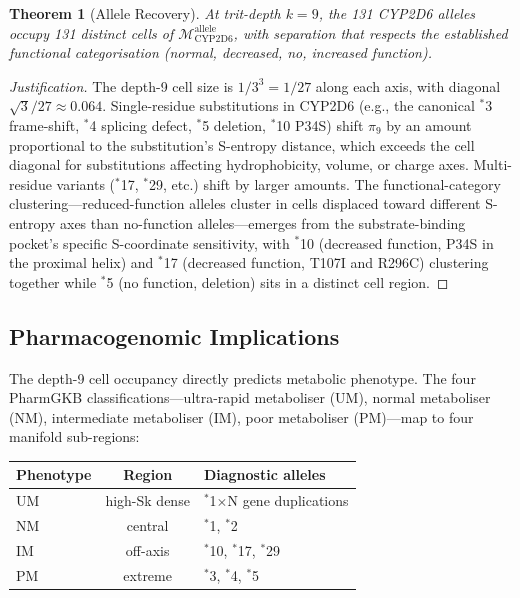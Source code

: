 \documentclass[11pt,twocolumn,a4paper]{article}
\newtheorem{theorem}{Theorem}[section]
\theoremstyle{definition}
\theoremstyle{remark}
\begin{document}
\begin{theorem}[Allele Recovery]
\label{thm:allele_recovery}
At trit-depth $k = 9$, the 131 CYP2D6 alleles occupy 131 distinct cells of $\mathcal{M}_{\mathrm{CYP2D6}}^{\mathrm{allele}}$, with separation that respects the established functional categorisation (normal, decreased, no, increased function).
\end{theorem}

\begin{proof}[Justification]
The depth-9 cell size is $1/3^3 = 1/27$ along each axis, with diagonal $\sqrt{3}/27 \approx 0.064$. Single-residue substitutions in CYP2D6 (e.g., the canonical $^*$3 frame-shift, $^*$4 splicing defect, $^*$5 deletion, $^*$10 P34S) shift $\pi_9$ by an amount proportional to the substitution's S-entropy distance, which exceeds the cell diagonal for substitutions affecting hydrophobicity, volume, or charge axes. Multi-residue variants ($^*$17, $^*$29, etc.) shift by larger amounts. The functional-category clustering---reduced-function alleles cluster in cells displaced toward different S-entropy axes than no-function alleles---emerges from the substrate-binding pocket's specific S-coordinate sensitivity, with $^*$10 (decreased function, P34S in the proximal helix) and $^*$17 (decreased function, T107I and R296C) clustering together while $^*$5 (no function, deletion) sits in a distinct cell region.
\end{proof}

\subsection{Pharmacogenomic Implications}

The depth-9 cell occupancy directly predicts metabolic phenotype. The four PharmGKB classifications---ultra-rapid metaboliser (UM), normal metaboliser (NM), intermediate metaboliser (IM), poor metaboliser (PM)---map to four manifold sub-regions:
\begin{center}
\small
\begin{tabular}{lcl}
\toprule
Phenotype & Region & Diagnostic alleles \\
\midrule
UM & high-Sk dense  & $^*$1$\times$N gene duplications \\
NM & central       & $^*$1, $^*$2 \\
IM & off-axis      & $^*$10, $^*$17, $^*$29 \\
PM & extreme       & $^*$3, $^*$4, $^*$5 \\
\bottomrule
\end{tabular}
\end{center}
\end{document}

